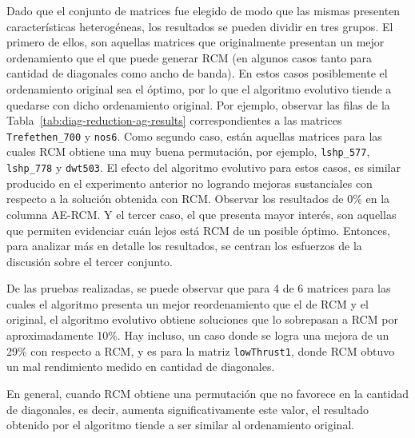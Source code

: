 Dado que el conjunto de matrices fue elegido de modo que las mismas presenten características heterogéneas, los resultados se pueden dividir en tres grupos.
El primero de ellos, son aquellas matrices que originalmente presentan un mejor ordenamiento que el que puede generar RCM (en algunos casos tanto para cantidad de diagonales como ancho de banda). En estos casos posiblemente el ordenamiento original sea el óptimo, por lo que el algoritmo evolutivo tiende a quedarse con dicho ordenamiento original. Por ejemplo, observar las filas de la Tabla~\ref{tab:diag-reduction-ag-results} correspondientes a las matrices \texttt{Trefethen\_700} y \texttt{nos6}. 
Como segundo caso, están aquellas matrices para las cuales RCM obtiene una muy buena permutación, por ejemplo, \texttt{lshp\_577}, \texttt{lshp\_778} y \texttt{dwt503}. El efecto del algoritmo evolutivo para estos casos, es similar producido en el experimento anterior no logrando mejoras sustanciales con respecto a la solución obtenida con RCM. Observar los resultados de 0\% en la columna AE-RCM.
Y el tercer caso, el que presenta mayor interés, son aquellas que permiten evidenciar cuán lejos está RCM de un posible óptimo. Entonces, para analizar más en detalle los resultados, se centran los esfuerzos de la discusión sobre el tercer conjunto. 

De las pruebas realizadas, se puede observar que para 4 de 6 matrices para las cuales el algoritmo presenta un mejor reordenamiento que el de RCM y el original, el algoritmo evolutivo obtiene soluciones que lo sobrepasan a RCM por aproximadamente 10\%. Hay incluso, un caso donde se logra una mejora de un 29\% con respecto a RCM, y es para la matriz \texttt{lowThrust1}, donde RCM obtuvo un mal rendimiento medido en cantidad de diagonales.

En general, cuando RCM obtiene una permutación que no favorece en la cantidad de  diagonales, es decir, aumenta significativamente este valor, el resultado obtenido por el algoritmo tiende a ser similar al ordenamiento original. %




